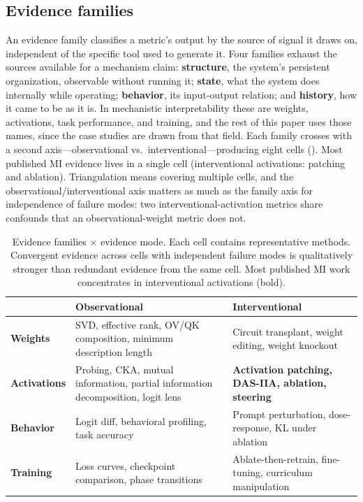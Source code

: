 \documentclass{article}
\begin{document}
\subsection{Evidence families}
\label{sec:evidence-families}

An evidence family classifies a metric's output by the source of signal it draws on, independent of the specific tool used to generate it. Four families exhaust the sources available for a mechanism claim: \textbf{structure}, the system's persistent organization, observable without running it; \textbf{state}, what the system does internally while operating; \textbf{behavior}, its input-output relation; and \textbf{history}, how it came to be as it is. In mechanistic interpretability these are weights, activations, task performance, and training, and the rest of this paper uses those names, since the case studies are drawn from that field. Each family crosses with a second axis---observational vs.\ interventional---producing eight cells (). Most published MI evidence lives in a single cell (interventional activations: patching and ablation). Triangulation means covering multiple cells, and the observational/interventional axis matters as much as the family axis for independence of failure modes: two interventional-activation metrics share confounds that an observational-weight metric does not.

\begin{table}[H]
\centering
\small
\caption{Evidence families $\times$ evidence mode. Each cell contains representative methods. Convergent evidence across cells with independent failure modes is qualitatively stronger than redundant evidence from the same cell. Most published MI work concentrates in interventional activations (bold).}
\label{tab:families}
\renewcommand{\arraystretch}{1.25}
\begin{tabular}{@{}l>{\raggedright\arraybackslash}p{5.8cm}>{\raggedright\arraybackslash}p{5.8cm}@{}}
\toprule
& \textbf{Observational} & \textbf{Interventional} \\
\midrule
\textbf{Weights} & SVD, effective rank, OV/QK composition, minimum description length & Circuit transplant, weight editing, weight knockout \\
\midrule
\textbf{Activations} & Probing, CKA, mutual information, partial information decomposition, logit lens & \textbf{Activation patching, DAS-IIA, ablation, steering} \\
\midrule
\textbf{Behavior} & Logit diff, behavioral profiling, task accuracy & Prompt perturbation, dose-response, KL under ablation \\
\midrule
\textbf{Training} & Loss curves, checkpoint comparison, phase transitions & Ablate-then-retrain, fine-tuning, curriculum manipulation \\
\bottomrule
\end{tabular}
\end{table}
\end{document}
